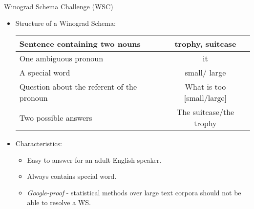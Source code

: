 \documentclass[svgnames, final, 20pt]{beamer} %
\begin{document}
\begin{frame}[fragile]
\begin{columns}[t]
\vspace{-1.8cm}
\begin{block}{Winograd Schema Challenge (WSC)}
	\justify
	\begin{itemize}
		\item Structure of a Winograd Schema:
		\begin{center}
			\begin{tabular}{ l | c }
				Sentence containing {\color{myorange}two nouns} &  {\color{myorange}trophy}, {\color{myorange}suitcase} \\
				\hline 
				One ambiguous {\color{myorange}pronoun} & {\color{myorange}it} \\  
				\hline
				A {\color{myorange}special word} & {\color{myorange}small}/{\color{myorange} large}\\
				\hline
				{\color{myorange}Question} about the referent of the pronoun & What is too [{\color{myorange}small}/{\color{myorange}large}]\\
				\hline
				{\color{myorange}Two} possible {\color{myorange}answers} & {\color{myorange}The suitcase}/{\color{myorange}the trophy}
			\end{tabular}
		\end{center}
		\item Characteristics:
		\begin{itemize}
			\item Easy to answer for an adult English speaker.
			\item Always contains {\color{myorange}special word}.
			\item \textit{Google-proof} - statistical methods over large text corpora should not be able to resolve a WS.
		\end{itemize}
	\end{itemize}
	

\end{block}
\end{columns}
\end{frame}
\end{document}
